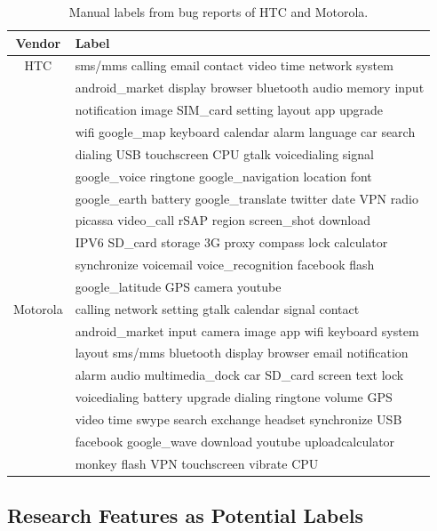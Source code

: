 \documentclass[10pt, conference, compsocconf]{IEEEtran}
\begin{document}
\begin{table}[!t]
\renewcommand{\arraystretch}{1.3}
\caption{Manual labels from bug reports of HTC and Motorola.}
\label{selected1}
\centering
\begin{tabular}{|c||l|}
\hline
Vendor & Label\\
\hline
HTC & sms\//mms calling email contact video time network system\\ 
  & android\_market display browser bluetooth audio memory input\\
  & notification image SIM\_card setting layout app upgrade\\
  & wifi google\_map keyboard calendar alarm language car search\\
  & dialing USB touchscreen CPU gtalk voicedialing signal\\
  & google\_voice ringtone google\_navigation location font\\
  & google\_earth battery google\_translate twitter date VPN radio\\
  & picassa video\_call rSAP region screen\_shot download\\
  & IPV6 SD\_card storage 3G proxy compass lock calculator\\
  & synchronize  voicemail  voice\_recognition facebook  flash\\
  & google\_latitude  GPS camera youtube\\
\hline
Motorola & calling network setting gtalk calendar signal contact\\
    & android\_market input camera image app wifi keyboard system\\
    & layout sms\//mms bluetooth display browser email notification\\
& alarm audio multimedia\_dock car SD\_card screen text lock\\
& voicedialing battery upgrade dialing ringtone volume GPS\\
& video time swype search exchange headset synchronize USB\\
& facebook google\_wave download youtube uploadcalculator\\
& monkey flash VPN touchscreen vibrate CPU\\
\hline
\end{tabular}
\end{table}


\subsection{Research Features as Potential Labels}
\end{document}
